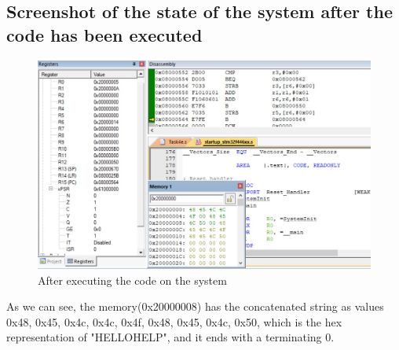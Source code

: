 \documentclass[footheight=20pt, footsepline, headheight=20pt, headsepline]{scrartcl}
\begin{document}
\subsection*{Screenshot of the state of the system after the code has been executed}
\begin{figure}[h!]
    \centering
    \includegraphics[scale=.7]{images/Task4e_After1.jpg}
    \caption{After executing the code on the system}
    \label{fig:after_task_4e}
\end{figure}
\FloatBarrier
As we can see, the memory(0x20000008) has the concatenated string as values 0x48, 0x45, 0x4c, 0x4c, 0x4f, 0x48, 0x45, 0x4c, 0x50, which is the hex representation of "HELLOHELP", and it ends with a terminating 0.


\end{document}

